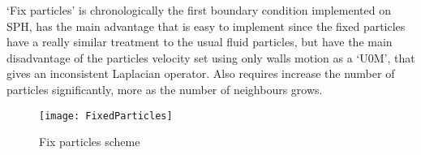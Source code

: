 %
`Fix particles' is chronologically the first boundary condition implemented on SPH, has the main advantage that is
easy to implement since the fixed particles have a really similar treatment to the usual fluid particles, but
have the main disadvantage of the particles velocity set using only walls motion as a `U0M', that gives an
inconsistent Laplacian operator. Also requires increase the number of particles significantly, more as the number of neighbours grows.
%
\begin{figure}[ht!]
  \centering
  \texttt{[image: FixedParticles]}
  \caption{Fix particles scheme}
  \label{fig:aquagpusph:FixParticlesScheme}
\end{figure}
%